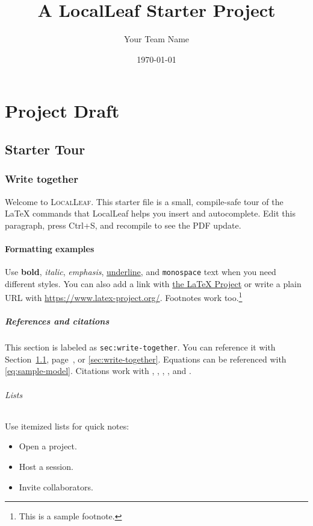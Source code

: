 \documentclass[11pt]{report}
\title{A LocalLeaf Starter Project}
\author{Your Team Name}
\date{\today}
\newcommand{\LocalLeaf}{\textsc{LocalLeaf}}
\newcommand{\parencite}[1]{\citep{#1}}
\newcommand{\textcite}[1]{\citet{#1}}
\begin{document}
\maketitle
\tableofcontents

\part{Project Draft}

\chapter{Starter Tour}
\label{chap:starter-tour}

\section{Write together}
\label{sec:write-together}

Welcome to \LocalLeaf. This starter file is a small, compile-safe tour of the LaTeX commands that LocalLeaf helps you insert and autocomplete. Edit this paragraph, press Ctrl+S, and recompile to see the PDF update.

\subsection{Formatting examples}
Use \textbf{bold}, \textit{italic}, \emph{emphasis}, \underline{underline}, and \texttt{monospace} text when you need different styles. You can also add a link with \href{https://www.latex-project.org/}{the LaTeX Project} or write a plain URL with \url{https://www.latex-project.org/}. Footnotes work too.\footnote{This is a sample footnote.}

\subsubsection{References and citations}
This section is labeled as \texttt{sec:write-together}. You can reference it with Section~\ref{sec:write-together}, page~\pageref{sec:write-together}, or \autoref{sec:write-together}. Equations can be referenced with \eqref{eq:sample-model}. Citations work with \cite{localleaf2026}, \citep{knuth1984}, \citet{localleaf2026}, \parencite{knuth1984}, and \textcite{localleaf2026}.

\paragraph{Lists}
Use itemized lists for quick notes:
\begin{itemize}
  \item Open a project.
  \item Host a session.
  \item Invite collaborators.
\end{itemize}
\end{document}
